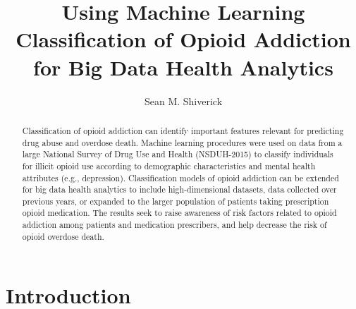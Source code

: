\documentclass[sigconf]{acmart}
\begin{document}
\title{Using Machine Learning Classification of Opioid Addiction
for Big Data Health Analytics}

  \author{Sean M. Shiverick}

\renewcommand{\shortauthors}{S.M. Shiverick}


\begin{abstract}
Classification of opioid addiction can identify important features relevant 
for predicting drug abuse and overdose death. Machine learning procedures were 
used on data from a large National Survey of Drug Use and Health (NSDUH-2015) 
to classify individuals for illicit opioid use according to demographic 
characteristics and mental health attributes (e.g., depression). Classification 
models of opioid addiction can be extended for big data health analytics to 
include high-dimensional datasets, data collected over previous years, or 
expanded to the larger population of patients taking prescription opioid 
medication. The results seek to raise awareness of risk factors related to 
opioid addiction among patients and medication prescribers, and help 
decrease the risk of opioid overdose death. 
\end{abstract}


\maketitle

\section{Introduction}
\end{document}
